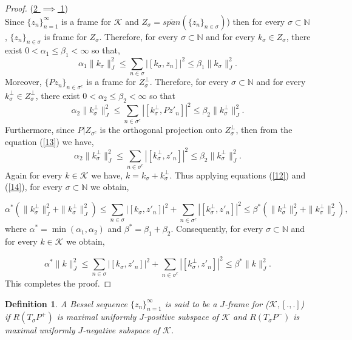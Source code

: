 \documentclass[article,12pt]{amsart}
\newtheorem{defn}[thm]{Definition}
\begin{document}
\begin{proof}
	\noindent  (\underline{2 $\implies$ 1})\\
	Since $\{z_n\}_{n=1}^\infty$ is a frame  for $\mathcal{K}$ and $ Z_\sigma = \overline{span}(\{z_n\}_{n\in \sigma})$) then for every $\sigma \subset\mathbb{N}$,
	$\{z_n\}_{n\in \sigma}$ is frame for $Z_\sigma.$
	Therefore, for every $\sigma\subset \mathbb{N}$ and for every $k_\sigma \in Z_\sigma$, there exist $0<\alpha_1\leq \beta_1< \infty$ so that, 
	\begin{equation}\label{12}
	\alpha_1 \|k_\sigma\|_{J}^2 \leq \sum\limits_{n \in \sigma} |[k_\sigma, z_n]|^2  \leq \beta_1 \|k_\sigma\|_{J}^2.
	\end{equation}
	Moreover, $\{Pz_n\}_{n \in \sigma^c}$ is a frame for $Z^\perp_{\sigma}.$ Therefore, for every $\sigma\subset \mathbb{N}$ and for every $k^\perp_{\sigma} \in Z^\perp_\sigma$, there exist $0<\alpha_2\leq \beta_2< \infty$ so that
	\begin{equation}\label{13}
		\alpha_2\|k_\sigma^\perp\|_{J}^2 \leq \sum\limits_{n \in \sigma^c} |[k_\sigma^\perp, Pz'_n]|^2  \leq \beta_2 \|k_\sigma^\perp\|_{J}^2.
	\end{equation}
		Furthermore, since $P|Z_{\sigma^c}$ is the orthogonal projection  onto $Z^\perp_{\sigma}$, then from the equation (\ref{13}) we have,
		\begin{equation}\label{14}
		\alpha_2\|k_\sigma^\perp\|_{J}^2 \leq \sum\limits_{n \in \sigma^c} |[k_\sigma^\perp, z'_n]|^2  \leq \beta_2 \|k_\sigma^\perp\|_{J}^2.
	\end{equation}
	Again for every $k \in \mathcal{K}$ we have, $k = k_\sigma + k^\perp_\sigma$.
	Thus applying equations (\ref{12}) and (\ref{14}), for every $\sigma\subset \mathbb{N}$ we obtain,
	
	$$\alpha^*(\|k_\sigma^\perp\|_{J}^2 +\|k_\sigma^\perp\|_{J}^2 )\leq \sum\limits_{n \in \sigma} |[k_\sigma, z'_n]|^2 +\sum\limits_{n \in \sigma^c} |[k_\sigma^\perp, z'_n]|^2  \leq \beta^* (\|k_\sigma^\perp\|_{J}^2 +\|k_\sigma^\perp\|_{J}^2),$$
	where $\alpha^* = \min (\alpha_1, \alpha_2)$	and $\beta^* = \beta_1 + \beta_2$. Consequently, for every $\sigma\subset \mathbb{N}$ and for every $k \in \mathcal{K}$ we obtain,
	
	$$\alpha^*\|k\|_{J}^2  \leq \sum\limits_{n \in \sigma} |[k_\sigma, z'_n]|^2 +\sum\limits_{n \in \sigma^c} |[k_\sigma^\perp, z'_n]|^2  \leq \beta^* \|k\|_{J}^2.$$
This completes the proof.	
\end{proof}




\begin{defn}\cite{Gi12}\label{Bessel} 
A Bessel sequence $\{z_n\}^\infty_{n = 1}$ is said to be a $J$-frame for ($\mathcal{K}, [., .]$) if $R(T_{\sigma}P^+)$ is maximal uniformly $J$-positive subspace of $\mathcal{K}$ and $R(T_{\sigma}P^-)$ is maximal uniformly $J$-negative subspace of $\mathcal{K}$.

 
	   
	  \end{defn}
\end{document}
